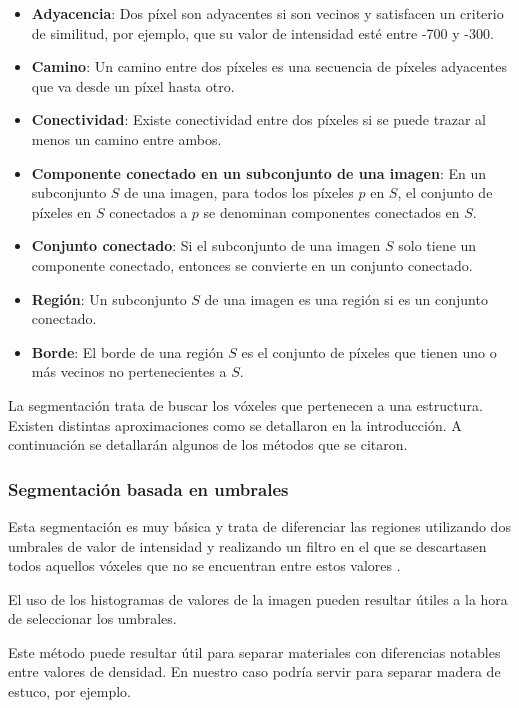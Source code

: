\begin{itemize}
	\item \textbf{Adyacencia}: Dos píxel son adyacentes si son vecinos y satisfacen un criterio de similitud, por ejemplo, que su valor de intensidad esté entre -700 y -300.
	\item \textbf{Camino}: Un camino entre dos píxeles es una secuencia de píxeles adyacentes que va desde un píxel hasta otro.
	\item \textbf{Conectividad}: Existe conectividad entre dos píxeles si se puede trazar al menos un camino entre ambos.
	\item \textbf{Componente conectado en un subconjunto de una imagen}: En un subconjunto $S$ de una imagen, para todos los píxeles $p$ en $S$, el conjunto de píxeles en $S$ conectados a $p$ se denominan componentes conectados en $S$.
	\item \textbf{Conjunto conectado}: Si el subconjunto de una imagen $S$ solo tiene un componente conectado, entonces se convierte en un conjunto conectado.
	\item \textbf{Región}: Un subconjunto $S$ de una imagen es una región si es un conjunto conectado.
	\item \textbf{Borde}: El borde de una región $S$ es el conjunto de píxeles que tienen uno o más vecinos no pertenecientes a $S$.
\end{itemize}

La segmentación trata de buscar los vóxeles que pertenecen a una estructura. Existen distintas aproximaciones como se detallaron en la introducción. A continuación se detallarán algunos de los métodos que se citaron.

\subsubsection{Segmentación basada en umbrales}

Esta segmentación es muy básica y trata de diferenciar las regiones utilizando dos umbrales de valor de intensidad y realizando un filtro en el que se descartasen todos aquellos vóxeles que no se encuentran entre estos valores \cite{otsu79}.

El uso de los histogramas de valores de la imagen pueden resultar útiles a la hora de seleccionar los umbrales.

Este método puede resultar útil para separar materiales con diferencias notables entre valores de densidad. En nuestro caso podría servir para separar madera de estuco, por ejemplo.

